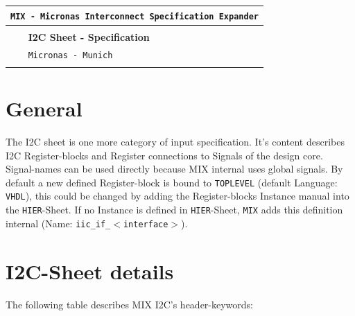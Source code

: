 \documentclass[a4paper,12pt]{report}
\begin{document}
\begin{titlepage}
\vspace*{70mm}
\centering
\begin{tabular}{p{20mm}l}
\multicolumn{2}{r}{\tt {MIX} - Micronas Interconnect Specification Expander}\\[1mm]
\hline \\[3mm]
&{\bf I2C Sheet - Specification}\\[5mm]
&{\tt Micronas - Munich}\\[5mm]
\hline \\[20mm]
\end{tabular}
\end{titlepage}


\raggedright

   \section{General}
The I2C sheet is one more category of input specification. It's content describes I2C Register-blocks and Register connections to Signals of the design core. Signal-names can be used directly because MIX internal uses global signals. By default a new defined Register-block is bound to {\tt TOPLEVEL} (default Language: {\tt VHDL}), this could be changed by adding the Register-blocks Instance manual into the {\tt HIER}-Sheet. If no Instance is defined in {\tt HIER}-Sheet, {\tt MIX} adds this definition internal (Name: {\tt iic\_if\_$<$interface$>$}).

\section{I2C-Sheet details}
The following table describes MIX I2C's header-keywords:
\end{document}
